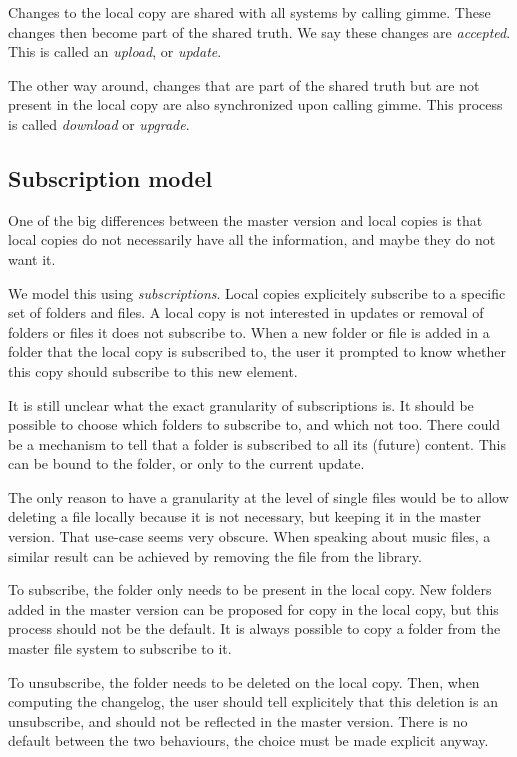 \documentclass[10pt,a4paper]{article}
\newcommand{\gimme}{\textsf{gimme}}
\begin{document}
Changes to the local copy are shared with all systems by calling \gimme. These changes then become part of the shared truth. We say these changes are \textit{accepted}. This is called an \textit{upload}, or \textit{update}.

The other way around, changes that are part of the shared truth but are not present in the local copy are also synchronized upon calling \gimme. This process is called \textit{download} or \textit{upgrade}.

\subsection{Subscription model}

One of the big differences between the master version and local copies is that local copies do not necessarily have all the information, and maybe they do not want it.

We model this using \textit{subscriptions}. Local copies explicitely subscribe to a specific set of folders and files. A local copy is not interested in updates or removal of folders or files it does not subscribe to. When a new folder or file is added in a folder that the local copy is subscribed to, the user it prompted to know whether this copy should subscribe to this new element.

It is still unclear what the exact granularity of subscriptions is. It should be possible to choose which folders to subscribe to, and which not too. There could be a mechanism to tell that a folder is subscribed to all its (future) content. This can be bound to the folder, or only to the current update.

The only reason to have a granularity at the level of single files would be to allow deleting a file locally because it is not necessary, but keeping it in the master version. That use-case seems very obscure. When speaking about music files, a similar result can be achieved by removing the file from the library.

To subscribe, the folder only needs to be present in the local copy. New folders added in the master version can be proposed for copy in the local copy, but this process should not be the default. It is always possible to copy a folder from the master file system to subscribe to it.

To unsubscribe, the folder needs to be deleted on the local copy. Then, when computing the changelog, the user should tell explicitely that this deletion is an unsubscribe, and should not be reflected in the master version. There is no default between the two behaviours, the choice must be made explicit anyway.
\end{document}
